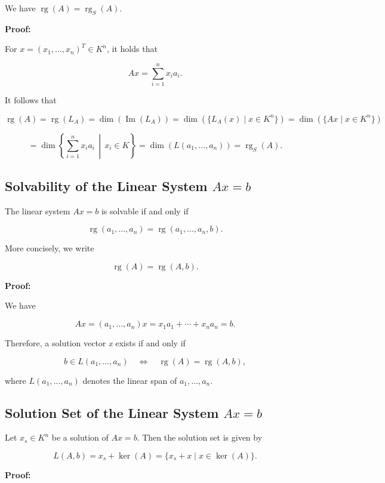We have \(\operatorname{rg}(A) = \operatorname{rg}_S(A)\).
\vspace{\baselineskip}

\textbf{Proof:} 

For \(x = {(x_1, \ldots, x_n)}^T \in K^n\), it holds that

\[
	Ax = \sum_{i=1}^{n} x_i a_i.
\]

It follows that

\[
	\operatorname{rg}(A) = \operatorname{rg}(L_A) = \dim(\operatorname{Im}(L_A))
	= \dim\left(\{L_A(x) \mid x \in K^n\}\right)
	= \dim\left(\{Ax \mid x \in K^n\}\right)
\]

\[
	= \dim\left\{ \sum_{i=1}^{n} x_i a_i \,\middle|\, x_i \in K \right\}
	= \dim(L(a_1, \ldots, a_n)) = \operatorname{rg}_S(A).
\]

\subsection{Solvability of the Linear System \texorpdfstring{\(Ax = b\)}{}}

The linear system \(Ax = b\) is solvable if and only if

\[
	\operatorname{rg}(a_1, \ldots, a_n) = \operatorname{rg}(a_1, \ldots, a_n, b).
\]

More concisely, we write

\[
	\operatorname{rg}(A) = \operatorname{rg}(A, b).
\]

\textbf{Proof:} 

We have

\[
	Ax = (a_1, \ldots, a_n)x = x_1 a_1 + \cdots + x_n a_n = b.
\]

Therefore, a solution vector \emph{x} exists if and only if

\[
	b \in L(a_1, \ldots, a_n) \quad \Leftrightarrow \quad \operatorname{rg}(A) = \operatorname{rg}(A, b),
\]

where \(L(a_1, \ldots, a_n)\) denotes the linear span of \(a_1, \ldots, a_n\).

\subsection{Solution Set of the Linear System \texorpdfstring{\(Ax = b\)}{}}

Let \(x_s \in K^n\) be a solution of \(Ax = b\). Then the solution set is given by

\[
	L(A, b) = x_s + \ker(A) = \{x_s + x \mid x \in \ker(A)\}.
\]

\textbf{Proof:}

